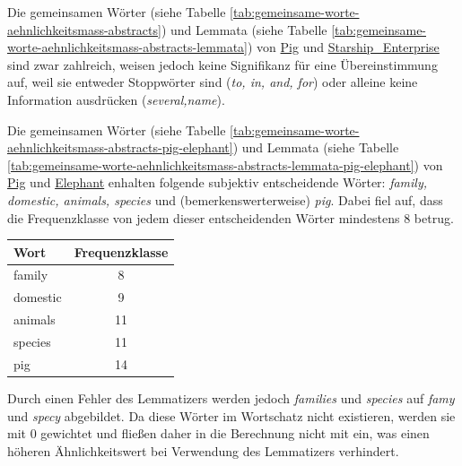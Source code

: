 Die gemeinsamen Wörter (siehe Tabelle \ref{tab:gemeinsame-worte-aehnlichkeitsmass-abstracts}) und Lemmata (siehe Tabelle \ref{tab:gemeinsame-worte-aehnlichkeitsmass-abstracts-lemmata}) 
von \url{Pig} und \url{Starship_Enterprise} sind zwar zahlreich, weisen jedoch keine Signifikanz für eine Übereinstimmung auf, weil sie entweder Stoppwörter sind (\emph{to, in, and, for}) 
oder alleine keine Information ausdrücken (\emph{several,name}).

Die gemeinsamen Wörter (siehe Tabelle \ref{tab:gemeinsame-worte-aehnlichkeitsmass-abstracts-pig-elephant}) und Lemmata (siehe Tabelle \ref{tab:gemeinsame-worte-aehnlichkeitsmass-abstracts-lemmata-pig-elephant}) 
von \url{Pig} und \url{Elephant} enhalten folgende subjektiv entscheidende Wörter: \emph{family, domestic, animals, species} und (bemerkenswerterweise) \emph{pig}.
Dabei fiel auf, dass die Frequenzklasse von jedem dieser entscheidenden Wörter mindestens 8 betrug.

\begin{center}
\begin{tabular}{lc}
\toprule
Wort	&Frequenzklasse\\
\midrule
family		&8\\
domestic	&9\\
animals		&11\\
species		&11\\
pig		&14\\
\bottomrule
\end{tabular}
\end{center}

Durch einen Fehler des Lemmatizers werden jedoch \emph{families} und \emph{species} auf \emph{famy} und \emph{specy} abgebildet. Da diese Wörter im Wortschatz nicht existieren, werden sie mit 0 gewichtet und fließen daher
in die Berechnung nicht mit ein, was einen höheren Ähnlichkeitswert bei Verwendung des Lemmatizers verhindert.
